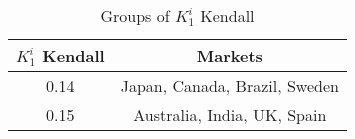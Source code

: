 
\begin{table}[ph]
\centering
\begin{tabular}{ |c|c| }
\hline
$K_1^i$ Kendall & Markets \\
\hline
    0.14 & Japan, Canada, Brazil, Sweden \\ 
 \hline 
0.15 & Australia, India, UK, Spain \\ 
 \hline 
\end{tabular}
\caption{Groups of $K_1^i$ Kendall}
\end{table}

